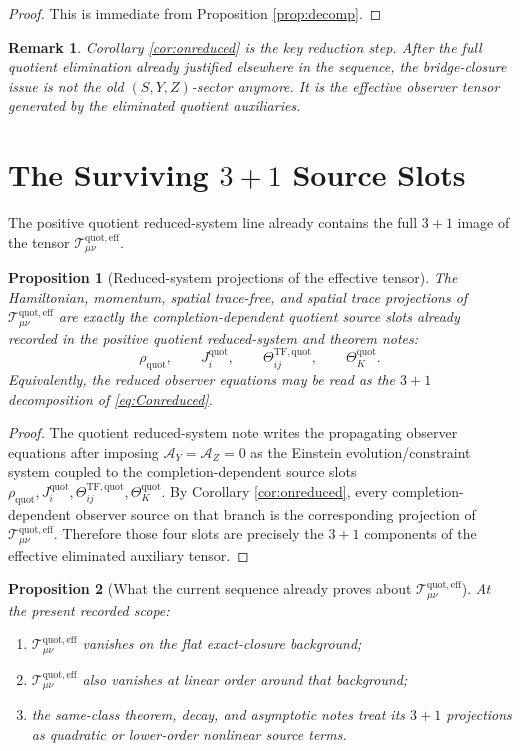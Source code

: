 \documentclass[11pt]{article}
\newcommand{\AY}{\mathcal A_Y}
\newcommand{\AZ}{\mathcal A_Z}
\newcommand{\EffAux}{\mathcal T_{\mu\nu}^{\mathrm{quot,eff}}}
\newtheorem{proposition}{Proposition}
\newtheorem{remark}{Remark}
\begin{document}
\begin{proof}
This is immediate from Proposition \ref{prop:decomp}.
\end{proof}

\begin{remark}
Corollary \ref{cor:onreduced} is the key reduction step. After the full quotient elimination already justified elsewhere in the sequence, the bridge-closure issue is not the old \((S,Y,Z)\)-sector anymore. It is the effective observer tensor generated by the eliminated quotient auxiliaries.
\end{remark}

\section{The Surviving \texorpdfstring{$3+1$}{3+1} Source Slots}

The positive quotient reduced-system line already contains the full \(3+1\) image of the tensor \(\EffAux\).

\begin{proposition}[Reduced-system projections of the effective tensor]
\label{prop:3plus1}
The Hamiltonian, momentum, spatial trace-free, and spatial trace projections of \(\EffAux\) are exactly the completion-dependent quotient source slots already recorded in the positive quotient reduced-system and theorem notes:
\[
\rho_{\mathrm{quot}},
\qquad
J_i^{\mathrm{quot}},
\qquad
\Theta_{ij}^{\mathrm{TF,quot}},
\qquad
\Theta_K^{\mathrm{quot}}.
\]
Equivalently, the reduced observer equations may be read as the \(3+1\) decomposition of \eqref{eq:Conreduced}.
\end{proposition}

\begin{proof}
The quotient reduced-system note writes the propagating observer equations after imposing \(\AY=\AZ=0\) as the Einstein evolution/constraint system coupled to the completion-dependent source slots \(\rho_{\mathrm{quot}},J_i^{\mathrm{quot}},\Theta_{ij}^{\mathrm{TF,quot}},\Theta_K^{\mathrm{quot}}\). By Corollary \ref{cor:onreduced}, every completion-dependent observer source on that branch is the corresponding projection of \(\EffAux\). Therefore those four slots are precisely the \(3+1\) components of the effective eliminated auxiliary tensor.
\end{proof}

\begin{proposition}[What the current sequence already proves about \texorpdfstring{\(\EffAux\)}{Teff}]
\label{prop:linear}
At the present recorded scope:
\begin{enumerate}
    \item \(\EffAux\) vanishes on the flat exact-closure background;
    \item \(\EffAux\) also vanishes at linear order around that background;
    \item the same-class theorem, decay, and asymptotic notes treat its \(3+1\) projections as quadratic or lower-order nonlinear source terms.
\end{enumerate}
\end{proposition}
\end{document}
